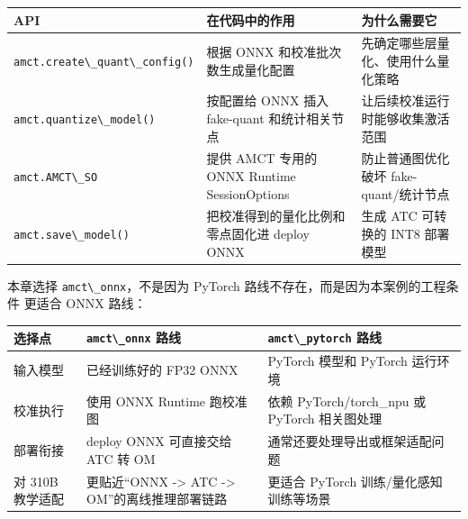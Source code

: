 \begin{longtable}[]{@{}
  >{\raggedright\arraybackslash}p{}
  >{\raggedright\arraybackslash}p{}
  >{\raggedright\arraybackslash}p{}@{}}
\toprule\noalign{}
\begin{minipage}[b]{\linewidth}\raggedright
API
\end{minipage} & \begin{minipage}[b]{\linewidth}\raggedright
在代码中的作用
\end{minipage} & \begin{minipage}[b]{\linewidth}\raggedright
为什么需要它
\end{minipage} \\
\midrule\noalign{}
\endhead
\bottomrule\noalign{}
\endlastfoot
\passthrough{\lstinline!amct.create\_quant\_config()!} & 根据 ONNX
和校准批次数生成量化配置 & 先确定哪些层量化、使用什么量化策略 \\
\passthrough{\lstinline!amct.quantize\_model()!} & 按配置给 ONNX 插入
fake-quant 和统计相关节点 & 让后续校准运行时能够收集激活范围 \\
\passthrough{\lstinline!amct.AMCT\_SO!} & 提供 AMCT 专用的 ONNX Runtime
SessionOptions & 防止普通图优化破坏 fake-quant/统计节点 \\
\passthrough{\lstinline!amct.save\_model()!} &
把校准得到的量化比例和零点固化进 deploy ONNX & 生成 ATC 可转换的 INT8
部署模型 \\
\end{longtable}

本章选择 \passthrough{\lstinline!amct\_onnx!}，不是因为 PyTorch
路线不存在，而是因为本案例的工程条件 更适合 ONNX 路线：

\begin{longtable}[]{@{}
  >{\raggedright\arraybackslash}p{}
  >{\raggedright\arraybackslash}p{}
  >{\raggedright\arraybackslash}p{}@{}}
\toprule\noalign{}
\begin{minipage}[b]{\linewidth}\raggedright
选择点
\end{minipage} & \begin{minipage}[b]{\linewidth}\raggedright
\passthrough{\lstinline!amct\_onnx!} 路线
\end{minipage} & \begin{minipage}[b]{\linewidth}\raggedright
\passthrough{\lstinline!amct\_pytorch!} 路线
\end{minipage} \\
\midrule\noalign{}
\endhead
\bottomrule\noalign{}
\endlastfoot
输入模型 & 已经训练好的 FP32 ONNX & PyTorch 模型和 PyTorch 运行环境 \\
校准执行 & 使用 ONNX Runtime 跑校准图 & 依赖 PyTorch/torch\_npu 或
PyTorch 相关图处理 \\
部署衔接 & deploy ONNX 可直接交给 ATC 转 OM &
通常还要处理导出或框架适配问题 \\
对 310B 教学适配 & 更贴近``ONNX -\textgreater{} ATC -\textgreater{}
OM''的离线推理部署链路 & 更适合 PyTorch 训练/量化感知训练等场景 \\
\end{longtable}


